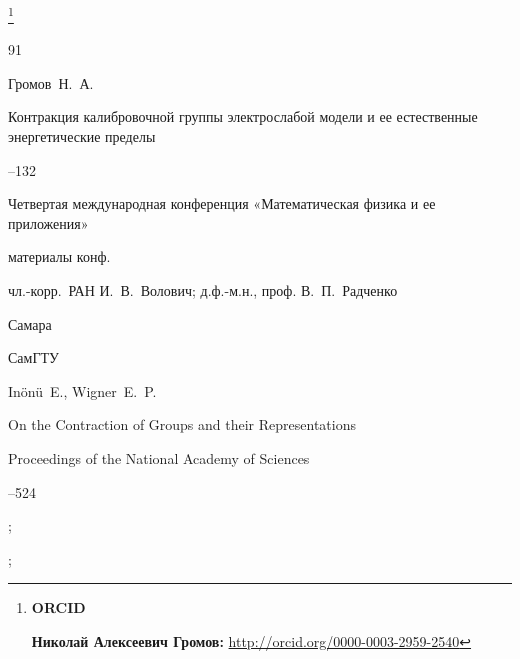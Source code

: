 


\thanks{{\bf ORCID}





{\bf  Николай Алексеевич Громов:} \url{http://orcid.org/0000-0003-2959-2540}



}








\RusRef



\begin{thebibliography}{91}




\by  Громов~Н.~А.

\paper  Контракция калибровочной группы электрослабой модели и ее естественные энергетические пределы 

--132

\inbook Четвертая международная конференция «Математическая физика и ее приложения»

\bookinfo материалы конф. 

\eds чл.-корр.~РАН И.~В.~Волович; д.ф.-м.н., проф. В.~П.~Радченко

\publaddr Самара

\publ СамГТУ







\by In{\"o}n{\"u}~E., Wigner~E.~P.  

\paper On the Contraction of Groups and their Representations

\jour   Proceedings of the National Academy of Sciences




--524

;


;








\end{thebibliography}
